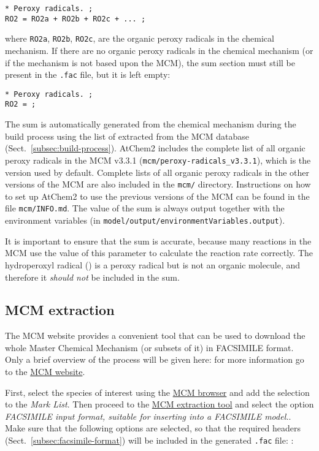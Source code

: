 \begin{verbatim}
* Peroxy radicals. ;
RO2 = RO2a + RO2b + RO2c + ... ;
\end{verbatim}

where \texttt{RO2a}, \texttt{RO2b}, \texttt{RO2c}, are the organic
peroxy radicals in the chemical mechanism. If there are no organic
peroxy radicals in the chemical mechanism (or if the mechanism is not
based upon the MCM), the  sum section must still be present in
the \texttt{.fac} file, but it is left empty:

\begin{verbatim}
* Peroxy radicals. ;
RO2 = ;
\end{verbatim}

The  sum is automatically generated from the chemical
mechanism during the build process using the list of 
extracted from the MCM database (Sect.~\ref{subsec:build-process}).
AtChem2 includes the complete list of all organic peroxy radicals in
the MCM v3.3.1 (\texttt{mcm/peroxy-radicals\_v3.3.1}), which is the
version used by default. Complete lists of all organic peroxy radicals
in the other versions of the MCM are also included in the
\texttt{mcm/} directory. Instructions on how to set up AtChem2 to use
the previous versions of the MCM can be found in the file
\texttt{mcm/INFO.md}. The value of the  sum is always output
together with the environment variables (in
\texttt{model/output/environmentVariables.output}).

It is important to ensure that the  sum is accurate, because
many reactions in the MCM use the value of this parameter to calculate
the reaction rate correctly. The hydroperoxyl radical () is a
peroxy radical but is not an organic molecule, and therefore it
\emph{should not} be included in the  sum.

\subsection{MCM extraction} \label{subsec:mcm-extraction}

The MCM website provides a convenient tool that can be used to
download the whole Master Chemical Mechanism (or subsets of it) in
FACSIMILE format. Only a brief overview of the process will be given
here: for more information go to the \href{http://mcm.leeds.ac.uk/}{MCM website}.

First, select the species of interest using the
\href{http://mcm.leeds.ac.uk/MCM/roots.htt}{MCM browser} and add the
selection to the \emph{Mark List}. Then proceed to the
\href{http://mcm.leeds.ac.uk/MCM/extract.htt}{MCM extraction tool} and
select the option \emph{FACSIMILE input format, suitable for inserting
  into a FACSIMILE model.}. Make sure that the following options are
selected, so that the required headers (Sect.~\ref{subsec:facsimile-format})
will be included in the generated \texttt{.fac} file: :

